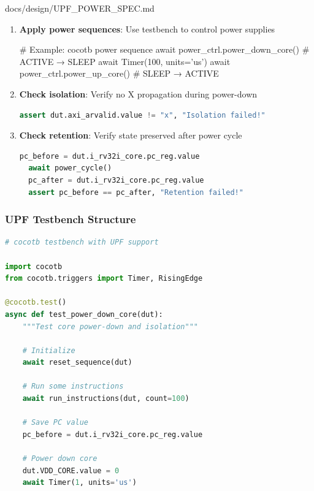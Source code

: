 \begin{relocated}{docs/design/UPF_POWER_SPEC.md}
\begin{enumerate}
  \begin{lstlisting}[language=bash]
  verilator --upf phase2_pipelined_cpu.upf ...
  \end{lstlisting}
\item
  \textbf{Apply power sequences}: Use testbench to control power
  supplies

  \begin{textblock}
  # Example: cocotb power sequence
  await power_ctrl.power_down_core()  # ACTIVE → SLEEP
  await Timer(100, units='us')
  await power_ctrl.power_up_core()    # SLEEP → ACTIVE
  \end{textblock}
\item
  \textbf{Check isolation}: Verify no X propagation during power-down

  \begin{lstlisting}[language=Python]
  assert dut.axi_arvalid.value != "x", "Isolation failed!"
  \end{lstlisting}
\item
  \textbf{Check retention}: Verify state preserved after power cycle

  \begin{lstlisting}[language=Python]
  pc_before = dut.i_rv32i_core.pc_reg.value
  await power_cycle()
  pc_after = dut.i_rv32i_core.pc_reg.value
  assert pc_before == pc_after, "Retention failed!"
  \end{lstlisting}
\end{enumerate}

\subsubsection{UPF Testbench Structure}\label{ds:ch:upf-power-spec:upf-testbench-structure}

\begin{lstlisting}[language=Python]
# cocotb testbench with UPF support

import cocotb
from cocotb.triggers import Timer, RisingEdge

@cocotb.test()
async def test_power_down_core(dut):
    """Test core power-down and isolation"""

    # Initialize
    await reset_sequence(dut)

    # Run some instructions
    await run_instructions(dut, count=100)

    # Save PC value
    pc_before = dut.i_rv32i_core.pc_reg.value

    # Power down core
    dut.VDD_CORE.value = 0
    await Timer(1, units='us')


\end{lstlisting}
\end{relocated}
